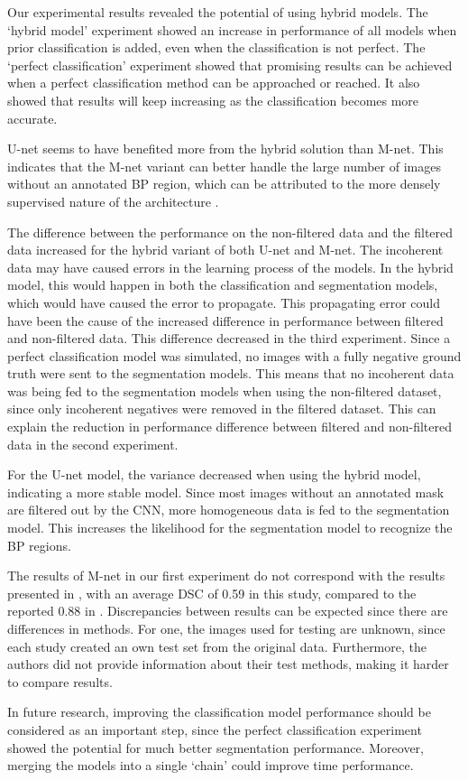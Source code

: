 Our experimental results revealed the potential of using hybrid models. The `hybrid model' experiment showed an increase in performance of all models when prior classification is added, even when the classification is not perfect. The `perfect classification' experiment showed that promising results can be achieved when a perfect classification method can be approached or reached. It also showed that results will keep increasing as the classification becomes more accurate. 
 
U-net seems to have benefited more from the hybrid solution than M-net. This indicates that the M-net variant can better handle the large number of images without an annotated BP region, which can be attributed to the more densely supervised nature of the architecture \cite{Abraham2019}.

The difference between the performance on the non-filtered data and the filtered data increased for the hybrid variant of both U-net and M-net. The incoherent data may have caused errors in the learning process of the models. In the hybrid model, this would happen in both the classification and segmentation models, which would have caused the error to propagate. This propagating error could have been the cause of the increased difference in performance between filtered and non-filtered data.
This difference decreased in the third experiment. Since a perfect classification model was simulated, no images with a fully negative ground truth were sent to the segmentation models. This means that no incoherent data was being fed to the segmentation models when using the non-filtered dataset, since only incoherent negatives were removed in the filtered dataset. This can explain the reduction in performance difference between filtered and non-filtered data in the second experiment.

For the U-net model, the variance decreased when using the hybrid model, indicating a more stable model. Since most images without an annotated mask are filtered out by the CNN, more homogeneous data is fed to the segmentation model. This increases the likelihood for the segmentation model to recognize the BP regions. 

The results of M-net in our first experiment do not correspond with the results presented in \cite{Abraham2019}, with an average DSC of 0.59 in this study, compared to the reported 0.88 in \cite{Abraham2019}. Discrepancies between results can be expected since there are differences in methods. For one, the images used for testing are unknown, since each study created an own test set from the original data. Furthermore, the authors did not provide information about their test methods, making it harder to compare results. 

In future research, improving the classification model performance should be considered as an important step, since the perfect classification experiment showed the potential for much better segmentation performance. Moreover, merging the models into a single `chain' could improve time performance.

